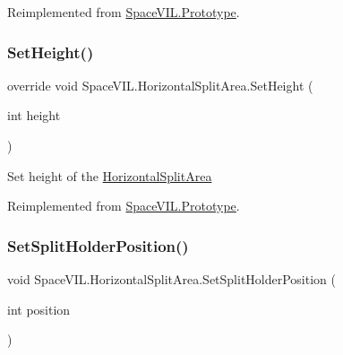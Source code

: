 Reimplemented from \mbox{\hyperlink{class_space_v_i_l_1_1_prototype_ac3379fe02923ee155b5b0084abf27420}{Space\+V\+I\+L.\+Prototype}}.

\mbox{\label{class_space_v_i_l_1_1_horizontal_split_area_ab018f220de9d5f76f52d3068925d1bdf}} 
\subsubsection{\texorpdfstring{Set\+Height()}{SetHeight()}}
{\footnotesize\ttfamily override void Space\+V\+I\+L.\+Horizontal\+Split\+Area.\+Set\+Height (\begin{DoxyParamCaption}\item[{int}]{height }\end{DoxyParamCaption})\hspace{0.3cm}{\ttfamily [virtual]}}



Set height of the \mbox{\hyperlink{class_space_v_i_l_1_1_horizontal_split_area}{Horizontal\+Split\+Area}} 



Reimplemented from \mbox{\hyperlink{class_space_v_i_l_1_1_prototype_adc0adcbd1c3800d9525798ba7be5832a}{Space\+V\+I\+L.\+Prototype}}.

\mbox{\label{class_space_v_i_l_1_1_horizontal_split_area_a0e39ace0e53c5ec509c7b40168b025ae}} 
\subsubsection{\texorpdfstring{Set\+Split\+Holder\+Position()}{SetSplitHolderPosition()}}
{\footnotesize\ttfamily void Space\+V\+I\+L.\+Horizontal\+Split\+Area.\+Set\+Split\+Holder\+Position (\begin{DoxyParamCaption}\item[{int}]{position }\end{DoxyParamCaption})}



